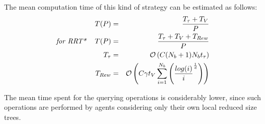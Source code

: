 The mean computation time of this kind of strategy can be estimated as follows:
\begin{eqnarray}
T(P) &=& \frac{T_{\tau} + T_V}{P} \nonumber\\
\textit{for RRT* \,\,\,\,\,}   
T(P) &=& \frac{T_{\tau} + T_V + T_{Rew}}{P}   \nonumber\\
T_{\tau} & = & \mathcal{O} \left( C (N_b+1)N_b t_{\tau} \right) \nonumber\\
T_{Rew}  & = & \mathcal{O} \left( C \gamma t_V \sum_{i=1}^{N_b} \left( \frac{log(i)}{i}^{\frac{1}{d}} \right) \right)  
\end{eqnarray}
 
The mean time spent for the querying operations is considerably lower, since such operations are performed by agents considering only their own local reduced size trees. 